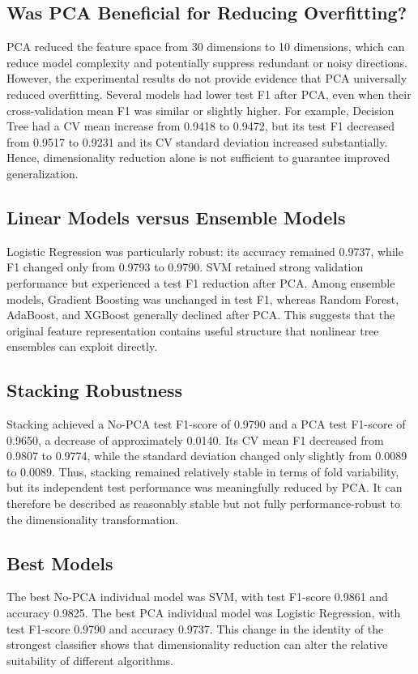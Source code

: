 \documentclass[12pt,a4paper]{article}
\begin{document}
\subsection{Was PCA Beneficial for Reducing Overfitting?}
PCA reduced the feature space from 30 dimensions to 10 dimensions, which can reduce model complexity and potentially suppress redundant or noisy directions. However, the experimental results do not provide evidence that PCA universally reduced overfitting. Several models had lower test F1 after PCA, even when their cross-validation mean F1 was similar or slightly higher. For example, Decision Tree had a CV mean increase from 0.9418 to 0.9472, but its test F1 decreased from 0.9517 to 0.9231 and its CV standard deviation increased substantially. Hence, dimensionality reduction alone is not sufficient to guarantee improved generalization.

\subsection{Linear Models versus Ensemble Models}
Logistic Regression was particularly robust: its accuracy remained 0.9737, while F1 changed only from 0.9793 to 0.9790. SVM retained strong validation performance but experienced a test F1 reduction after PCA. Among ensemble models, Gradient Boosting was unchanged in test F1, whereas Random Forest, AdaBoost, and XGBoost generally declined after PCA. This suggests that the original feature representation contains useful structure that nonlinear tree ensembles can exploit directly.

\subsection{Stacking Robustness}
Stacking achieved a No-PCA test F1-score of 0.9790 and a PCA test F1-score of 0.9650, a decrease of approximately 0.0140. Its CV mean F1 decreased from 0.9807 to 0.9774, while the standard deviation changed only slightly from 0.0089 to 0.0089. Thus, stacking remained relatively stable in terms of fold variability, but its independent test performance was meaningfully reduced by PCA. It can therefore be described as reasonably stable but not fully performance-robust to the dimensionality transformation.

\subsection{Best Models}
The best No-PCA individual model was SVM, with test F1-score 0.9861 and accuracy 0.9825. The best PCA individual model was Logistic Regression, with test F1-score 0.9790 and accuracy 0.9737. This change in the identity of the strongest classifier shows that dimensionality reduction can alter the relative suitability of different algorithms.
\end{document}
